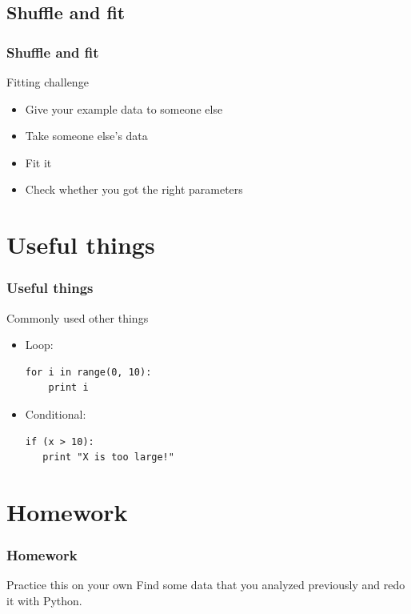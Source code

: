 \documentclass{beamer}
\begin{document}
\subsection{Shuffle and fit}
\begin{frame}
  \frametitle{Shuffle and fit}
  \begin{block}{Fitting challenge}
	 \begin{itemize}[<+->]
		 \item Give your example data to someone else
		 \item Take someone else's data
		 \item Fit it
		 \item Check whether you got the right parameters
	 \end{itemize}
  \end{block}
\end{frame}

\section{Useful things}
\begin{frame}[fragile]
  \frametitle{Useful things}
  \begin{block}{Commonly used other things}
	 \begin{itemize}[<+->]
		 \item Loop:
\begin{lstlisting}
for i in range(0, 10):
    print i
\end{lstlisting}
		 \item Conditional:
\begin{lstlisting}
if (x > 10):
   print "X is too large!"
\end{lstlisting}
	 \end{itemize}
  \end{block}
\end{frame}

\section{Homework}
\begin{frame}
  \frametitle{Homework}
  \begin{block}{Practice this on your own}
  Find some data that you analyzed previously and redo it with Python.
  \end{block}
\end{frame}
\end{document}
